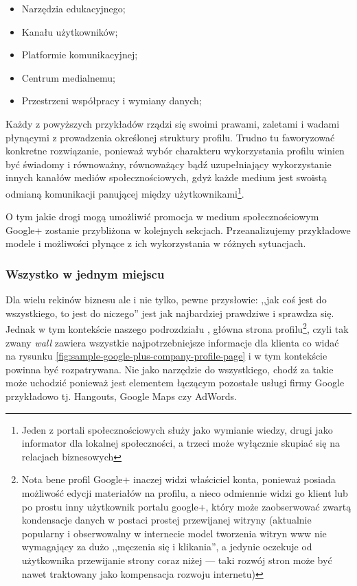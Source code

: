 \begin{itemize}
\item Narzędzia edukacyjnego;
\item Kanału użytkowników;
\item Platformie komunikacyjnej;
\item Centrum medialnemu;
\item Przestrzeni współpracy i wymiany danych;
\end{itemize}

Każdy z powyższych przykładów rządzi się swoimi prawami, zaletami i wadami płynącymi z prowadzenia określonej struktury profilu. Trudno tu faworyzować konkretne rozwiązanie, ponieważ wybór charakteru wykorzystania profilu winien być świadomy i równoważny, równoważący bądź uzupełniający wykorzystanie innych kanałów mediów społecznościowych, gdyż każde medium jest swoistą odmianą komunikacji panującej między użytkownikami\footnote{Jeden  z portali społecznościowych służy jako wymianie wiedzy, drugi jako informator dla lokalnej społeczności, a trzeci może wyłącznie skupiać się na relacjach biznesowych}.

O tym jakie drogi mogą umożliwić promocja w medium społecznościowym \mbox{Google+} zostanie przybliżona w kolejnych sekcjach. Przeanalizujemy przykładowe modele i możliwości płynące z ich wykorzystania w różnych sytuacjach.


\subsubsection{\nmu Wszystko w jednym miejscu}
\label{subsubsec:wszystko-w-jednym-miejscu}
Dla wielu rekinów biznesu ale i nie tylko, pewne przysłowie: ,,jak coś jest  do wszystkiego, to jest do niczego'' jest jak najbardziej prawdziwe i sprawdza się. Jednak w tym kontekście naszego podrozdziału , główna strona profilu\footnote{Nota bene profil Google+ inaczej widzi właściciel konta, ponieważ posiada możliwość edycji materiałów na profilu, a nieco odmiennie widzi go klient lub po prostu inny użytkownik portalu google+, który może zaobserwować zwartą kondensacje danych w postaci prostej przewijanej witryny (aktualnie popularny i obserwowalny w internecie model tworzenia witryn www nie wymagający za dużo ,,męczenia się i klikania'', a jedynie oczekuje od użytkownika przewijanie strony coraz niżej --- taki rozwój stron może być nawet traktowany jako kompensacja rozwoju internetu)}, czyli tak zwany \textit{wall} zawiera wszystkie najpotrzebniejsze informacje dla klienta co widać na rysunku \ref{fig:sample-google-plus-company-profile-page} i w tym kontekście powinna być rozpatrywana. Nie jako narzędzie do wszystkiego, chodź za takie może uchodzić ponieważ jest elementem łączącym pozostałe usługi firmy Google przykładowo tj. Hangouts, Google Maps czy AdWords. 

